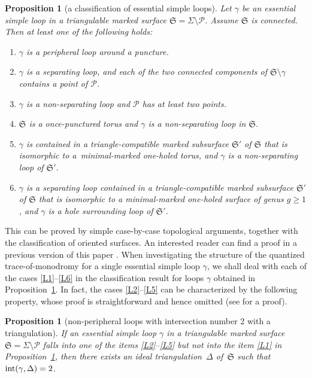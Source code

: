 \documentclass[10pt,a4paper]{amsart}
\numberwithin{equation}{section}
\newtheorem{Proposition}[Theorem]{Proposition}
\theoremstyle{definition}
\begin{document}
\begin{Proposition}[a classification of essential simple loops]
\label{prop:loop_classification}
Let $\gamma$ be an essential simple loop in a triangulable marked surface $\mathfrak{S} = \Sigma\setminus \mathcal{P}$. Assume $\mathfrak{S}$ is connected. Then at least one of the following holds:
\begin{enumerate}[label={\rm (L\arabic*)}]\itemsep=0pt
\item\label{L1} $\gamma$ is a peripheral loop around a puncture.
\item\label{L2} $\gamma$ is a separating loop, and each of the two connected components of $\mathfrak{S} \setminus \gamma$ contains a point of $\mathcal{P}$.
\item\label{L3} $\gamma$ is a non-separating loop and $\mathcal{P}$ has at least two points.
\item\label{L4} $\mathfrak{S}$ is a once-punctured torus and $\gamma$ is a non-separating loop in $\mathfrak{S}$.
\item\label{L5} $\gamma$ is contained in a triangle-compatible marked subsurface $\mathfrak{S}'$ of $\mathfrak{S}$ that is isomorphic to a~minimal-marked one-holed torus, and $\gamma$ is a non-separating loop of $\mathfrak{S}'$.
\item\label{L6} $\gamma$ is a separating loop contained in a triangle-compatible marked subsurface $\mathfrak{S}'$ of $\mathfrak{S}$ that is isomorphic to a minimal-marked one-holed surface of genus $g\ge 1$, and $\gamma$ is a hole surrounding loop of $\mathfrak{S}'$.
\end{enumerate}
\end{Proposition}
This can be proved by simple case-by-case topological arguments, together with the classification of oriented surfaces. An interested reader can find a proof in a previous version of this paper \cite{ver3}.
When investigating the structure of the quantized trace-of-monodromy  for a single essential simple loop $\gamma$, we shall deal with each of the cases \ref{L1}--\ref{L6} in the classification result for loops $\gamma$ obtained in Proposition~\ref{prop:loop_classification}. In fact, the cases \ref{L2}--\ref{L5} can be characterized by the following property, whose proof is straightforward and hence omitted (see \cite{ver3} for a proof).
\begin{Proposition}[non-peripheral loops with intersection number 2 with a triangulation]
\label{prop:2_to_5_have_intersection_2}
If an essential simple loop $\gamma$ in a triangulable marked surface $\mathfrak{S} = \Sigma\setminus\mathcal{P}$ falls into one of the items \ref{L2}--\ref{L5} but not into the item \ref{L1} in Proposition~{\rm \ref{prop:loop_classification}}, then there exists an ideal triangulation~$\Delta$ of~$\mathfrak{S}$ such that ${\rm int}(\gamma,\Delta)=2$.
\end{Proposition}
\end{document}
